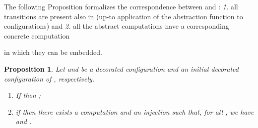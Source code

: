 \documentclass{LMCS}
\theoremstyle{plain}\newtheorem{proposition}[thm]{Proposition}
\theoremstyle{plain}\newtheorem{lemma}[thm]{Lemma}
\theoremstyle{plain}\newtheorem{theorem}[thm]{Theorem}
\theoremstyle{plain}\newtheorem{corollary}[thm]{Corollary}
\newif\ifconf \conffalse
\newcommand{\actsl}{}
\begin{document}
\ifconf
\else

\noindent The following Proposition formalizes the correspondence 
between  and : 
\emph{1.} all  transitions are present also in 
(up-to application of the abstraction 
function  to configurations) and
\emph{2.} all the abstract computations  have a corresponding concrete computation

in which they can be embedded.
\begin{proposition}
\label{prop:abssemantics}
Let  and  be a decorated configuration
and an initial 
decorated configuration 
of {\actsl}, respectively.
\begin{enumerate}
\item
If  then 
;
\item
if  then there exists a computation
 and an injection  
such that, for all , 
we have  and 
.
\end{enumerate}
\end{proposition}
\end{document}
